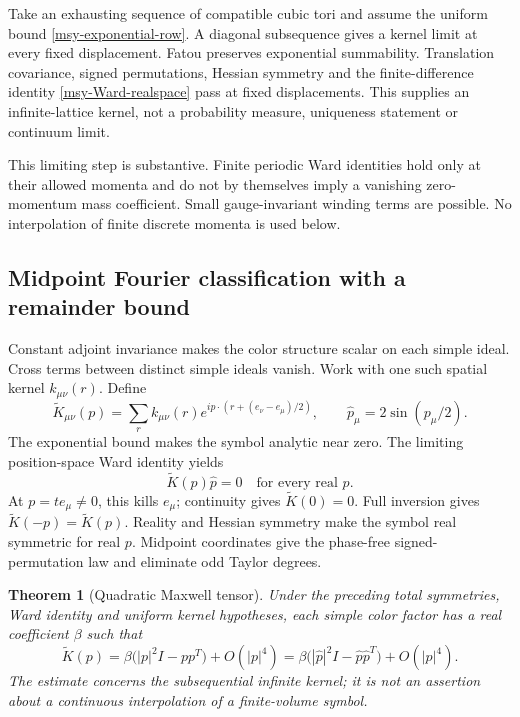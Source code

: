 \documentclass[11pt]{article}
\newtheorem{theorem}{Theorem}[section]
\theoremstyle{remark}
\begin{document}
Take an exhausting sequence of compatible cubic tori and
assume the uniform bound \eqref{msy-exponential-row}.
A diagonal subsequence gives a kernel limit at every fixed
displacement. Fatou preserves exponential summability.
Translation covariance, signed permutations, Hessian symmetry
and the finite-difference identity \eqref{msy-Ward-realspace}
pass at fixed displacements. This supplies an infinite-lattice
kernel, not a probability measure, uniqueness statement or
continuum limit.

This limiting step is substantive. Finite periodic Ward
identities hold only at their allowed momenta and do not
by themselves imply a vanishing zero-momentum mass
coefficient. Small gauge-invariant winding terms are possible.
No interpolation of finite discrete momenta is used below.

\subsection{Midpoint Fourier classification with a remainder bound}
\label{msy-classification-section}

Constant adjoint invariance makes the color structure scalar
on each simple ideal. Cross terms between distinct simple
ideals vanish. Work with one such spatial kernel
\(k_{\mu\nu}(r)\). Define
\begin{equation}
 \widetilde K_{\mu\nu}(p)=
 \sum_r k_{\mu\nu}(r)
       e^{ip\cdot(r+(e_\nu-e_\mu)/2)},\qquad
 \widehat p_\mu=2\sin(p_\mu/2).
 \label{msy-midpoint}
\end{equation}
The exponential bound makes the symbol analytic near zero.
The limiting position-space Ward identity yields
\begin{equation}
 \widetilde K(p)\widehat p=0
       \quad\text{for every real }p.
 \label{msy-Ward-symbol}
\end{equation}
At \(p=te_\mu\ne0\), this kills \(e_\mu\); continuity gives
\(\widetilde K(0)=0\). Full inversion gives
\(\widetilde K(-p)=\widetilde K(p)\). Reality and Hessian
symmetry make the symbol real symmetric for real \(p\).
Midpoint coordinates give the phase-free signed-permutation
law and eliminate odd Taylor degrees.

\begin{theorem}[Quadratic Maxwell tensor]
\label{msy-Maxwell-theorem}
Under the preceding total symmetries, Ward identity and
uniform kernel hypotheses, each simple color factor has
a real coefficient \(\beta\) such that
\begin{equation}
 \widetilde K(p)
 =\beta\bigl(|p|^2I-pp^T\bigr)+O(|p|^4)
 =\beta\bigl(|\widehat p|^2I-
                      \widehat p\widehat p^T\bigr)+O(|p|^4).
 \label{msy-Maxwell-expansion}
\end{equation}
The estimate concerns the subsequential infinite kernel;
it is not an assertion about a continuous interpolation
of a finite-volume symbol.
\end{theorem}
\end{document}
